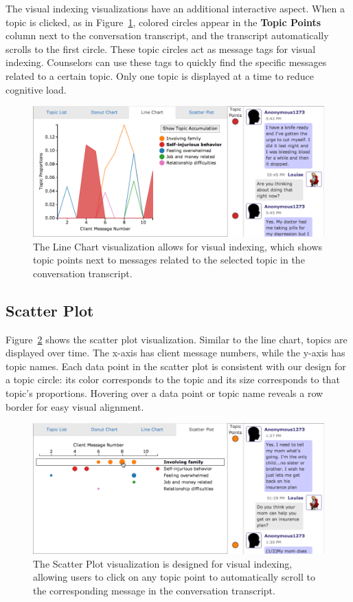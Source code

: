 The visual indexing visualizations have an additional interactive aspect. When a
topic is clicked, as in Figure~\ref{linechartpoints}, colored circles appear in the \textbf{Topic Points} column
next to the conversation transcript, and the transcript automatically scrolls to the
first circle. These topic circles act as message tags for visual indexing. Counselors can
use these tags to quickly find the specific messages related to a certain topic. Only
one topic is displayed at a time to reduce cognitive load.

\begin{figure}[h]
  \centering
    \includegraphics[width=\textwidth]{linechartpoints.png}
  \caption{The Line Chart visualization allows for visual indexing, which shows topic
  points next to messages related to the selected topic in the conversation transcript.}
  \label{linechartpoints}
\end{figure}

\subsection{Scatter Plot}

Figure~\ref{scatterplot} shows the scatter plot visualization. Similar to the line chart, topics are
displayed over time. The x-axis has client message numbers, while the y-axis has
topic names. Each data point in the scatter plot is consistent with our design for a
topic circle: its color corresponds to the topic and its size corresponds to that topic's
proportions. Hovering over a data point or topic name reveals a row border for easy
visual alignment.

\begin{figure}[h]
  \centering
    \includegraphics[width=\textwidth]{scatterplot.png}
  \caption{The Scatter Plot visualization is designed for visual indexing, allowing
  users to click on any topic point to automatically scroll to the corresponding message
  in the conversation transcript.}
  \label{scatterplot}
\end{figure}

